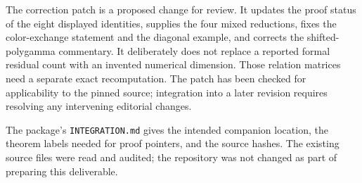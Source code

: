 The correction patch is a proposed change for review. It updates the
proof status of the eight displayed identities, supplies the four
mixed reductions, fixes the color-exchange statement and the diagonal
example, and corrects the shifted-polygamma commentary. It deliberately
does not replace a reported formal residual count with an invented
numerical dimension. Those relation matrices need a separate exact
recomputation. The patch has been checked for applicability to the
pinned source; integration into a later revision requires resolving
any intervening editorial changes.

The package's \texttt{INTEGRATION.md} gives the intended companion
location, the theorem labels needed for proof pointers, and the source
hashes. The existing source files were read and audited; the repository
was not changed as part of preparing this deliverable.
